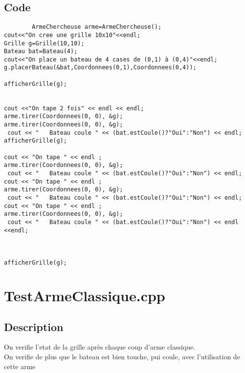         \subsection{Code}
	\begin{lstlisting}
		ArmeChercheuse arme=ArmeChercheuse();
cout<<"On cree une grille 10x10"<<endl;
Grille g=Grille(10,10);
Bateau bat=Bateau(4);
cout<<"On place un bateau de 4 cases de (0,1) à (0,4)"<<endl;
g.placerBateau(&bat,Coordonnees(0,1),Coordonnees(0,4));

afficherGrille(g);


cout <<"On tape 2 fois" << endl << endl;
arme.tirer(Coordonnees(0, 0), &g);
arme.tirer(Coordonnees(0, 0), &g);
 cout << "   Bateau coule " << (bat.estCoule()?"Oui":"Non") << endl;
afficherGrille(g);

cout << "On tape " << endl ;
arme.tirer(Coordonnees(0, 0), &g);
 cout << "   Bateau coule " << (bat.estCoule()?"Oui":"Non") << endl;
cout << "On tape " << endl ;
arme.tirer(Coordonnees(0, 0), &g);
 cout << "   Bateau coule " << (bat.estCoule()?"Oui":"Non") << endl;
cout << "On tape " << endl ;
arme.tirer(Coordonnees(0, 0), &g);
 cout << "   Bateau coule " << (bat.estCoule()?"Oui":"Non") << endl <<endl;



afficherGrille(g);
	\end{lstlisting}
    \section{TestArmeClassique.cpp}
        \subsection{Description}
            On verifie l'etat de la grille après chaque coup d'arme classique.\\
            On verifie de plus que le bateau est bien touche, pui coule, avec l'utilisation de cette arme
